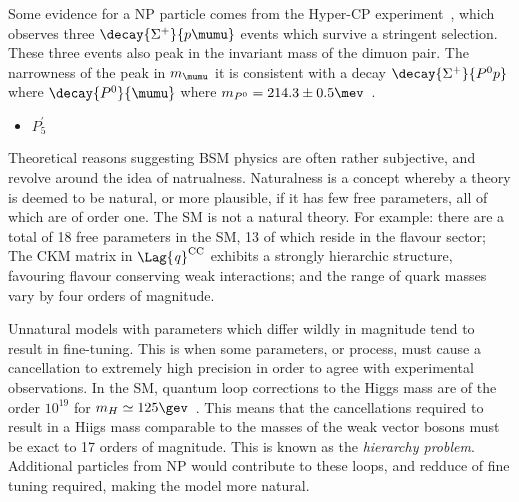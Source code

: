 Some evidence for a NP particle comes from the Hyper-CP experiment~\cite{Burnstein:2004uk}, which
observes three $\decay{\Sigma^+}{p\mumu}$ events which survive a stringent selection.
These three events also peak in the invariant mass of the dimuon pair.
The narrowness of the peak in $m_{\mumu}$ it is consistent with a decay $\decay{\Sigma^+}{P^0p}$
where $\decay{P^0}{\mumu}$ where $m_{P^0}=214.3\pm0.5\mev$~\cite{Park:2005eka}.

\begin{itemize}
  \item $P_5^\prime$
\end{itemize}




Theoretical reasons suggesting BSM physics
are often rather subjective, and revolve around the idea of natrualness.
Naturalness is a concept whereby a theory is deemed to be natural, or more plausible, if it has few
free parameters, all of which are of order one.
The SM is not a natural theory.
For example: there are a total of 18 free parameters in the SM, 13 of which reside in the flavour
sector;
The CKM matrix in $\Lag{\it q}^\mathrm{CC}$ exhibits a strongly hierarchic structure, favouring
flavour conserving weak interactions;
and the range of quark masses vary by four orders of magnitude.

Unnatural models with parameters which differ wildly in magnitude tend to result in fine-tuning.
This is when some parameters, or process, must cause a cancellation to extremely high precision in
order to agree with experimental observations.
In the SM, quantum loop corrections to the Higgs mass are of the order $10^{19}$
for $m_H\simeq125\gev$~\cite{Chatrchyan:2012ufa,Aad:2012tfa}.
This means that the cancellations required to result in a Hiigs mass comparable to the masses of
the weak vector bosons must be exact to 17 orders of magnitude.
This is known as the \emph{hierarchy problem}.
Additional particles from NP would contribute to these loops, and redduce of fine tuning required,
making the model more natural.

